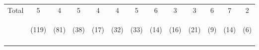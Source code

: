 \begin{tabular}{lcccccccccccc}
\noalign{\smallskip}Total & 5 & 4 & 5 & 4 & 4 & 5 & 6 & 3 & 3 & 6 & 7 & 2\\
 & \begin{footnotesize}(119)\end{footnotesize} & \begin{footnotesize}(81)\end{footnotesize} & \begin{footnotesize}(38)\end{footnotesize} & \begin{footnotesize}(17)\end{footnotesize} & \begin{footnotesize}(32)\end{footnotesize} & \begin{footnotesize}(33)\end{footnotesize} & \begin{footnotesize}(14)\end{footnotesize} & \begin{footnotesize}(16)\end{footnotesize} & \begin{footnotesize}(21)\end{footnotesize} & \begin{footnotesize}(9)\end{footnotesize} & \begin{footnotesize}(14)\end{footnotesize} & \begin{footnotesize}(6)\end{footnotesize}\\
\noalign{\smallskip}\hline\end{tabular}\\
